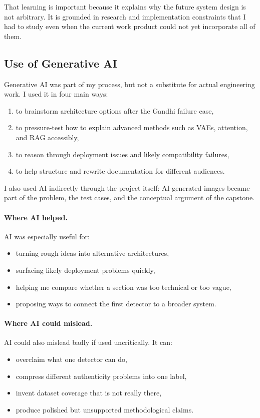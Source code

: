 \documentclass[11pt]{article}
\begin{document}
That learning is important because it explains why the future system design is not arbitrary. It is grounded in research and implementation constraints that I had to study even when the current work product could not yet incorporate all of them.

\subsection{Use of Generative AI}
Generative AI was part of my process, but not a substitute for actual engineering work. I used it in four main ways:
\begin{enumerate}[leftmargin=1.5em]
    \item to brainstorm architecture options after the Gandhi failure case,
    \item to pressure-test how to explain advanced methods such as VAEs, attention, and RAG accessibly,
    \item to reason through deployment issues and likely compatibility failures,
    \item to help structure and rewrite documentation for different audiences.
\end{enumerate}

I also used AI indirectly through the project itself: AI-generated images became part of the problem, the test cases, and the conceptual argument of the capstone.

\paragraph{Where AI helped.}
AI was especially useful for:
\begin{itemize}[leftmargin=1.5em]
    \item turning rough ideas into alternative architectures,
    \item surfacing likely deployment problems quickly,
    \item helping me compare whether a section was too technical or too vague,
    \item proposing ways to connect the first detector to a broader system.
\end{itemize}

\paragraph{Where AI could mislead.}
AI could also mislead badly if used uncritically. It can:
\begin{itemize}[leftmargin=1.5em]
    \item overclaim what one detector can do,
    \item compress different authenticity problems into one label,
    \item invent dataset coverage that is not really there,
    \item produce polished but unsupported methodological claims.
\end{itemize}
\end{document}
